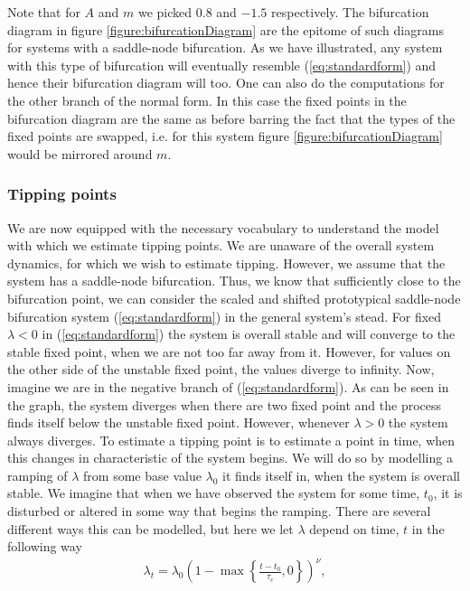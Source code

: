 Note that for $A$ and $m$ we picked $0.8$ and $-1.5$ respectively. The bifurcation diagram in figure \ref{figure:bifurcationDiagram} are the epitome of such diagrams for systems with a saddle-node bifurcation. As we have illustrated, any system with this type of bifurcation will eventually resemble (\ref{eq:standardform}) and hence their bifurcation diagram will too. One can also do the computations for the other branch of the normal form. In this case the fixed points in the bifurcation diagram are the same as before barring the fact that the types of the fixed points are swapped, i.e. for this system figure \ref{figure:bifurcationDiagram} would be mirrored around $m$.
\subsubsection{Tipping points}
We are now equipped with the necessary vocabulary to understand the model with which we estimate tipping points. We are unaware of the overall system dynamics, for which we wish to estimate tipping. However, we assume that the system has a saddle-node bifurcation. Thus, we know that sufficiently close to the bifurcation point, we can consider the scaled and shifted prototypical saddle-node bifurcation system (\ref{eq:standardform}) in the general system's stead. For fixed $\lambda < 0$ in (\ref{eq:standardform}) the system is overall stable and will converge to the stable fixed point, when we are not too far away from it. However, for values on the other side of the unstable fixed point, the values diverge to infinity. Now, imagine we are in the negative branch of (\ref{eq:standardform}). As can be seen in the graph, the system diverges when there are two fixed point and the process finds itself below the unstable fixed point. However, whenever $\lambda>0$ the system always diverges. To estimate a tipping point is to estimate a point in time, when this changes in characteristic of the system begins. We will do so by modelling a ramping of $\lambda$ from some base value $\lambda_0$ it finds itself in, when the system is overall stable. We imagine that when we have observed the system for some time, $t_0$, it is disturbed or altered in some way that begins the ramping. There are several different ways this can be modelled, but here we let $\lambda$ depend on time, $t$ in the following way
\begin{align}
    \lambda_t = \lambda_0\left(1 - \max\left\{\frac{t - t_0}{\tau_c},0\right\}\right)^\nu, \label{eq:lambdaRampDefinition}
\end{align} 
